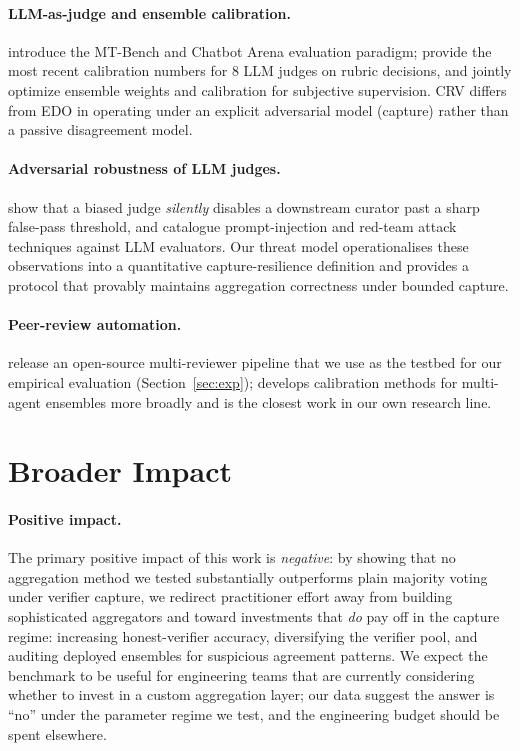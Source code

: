 \documentclass[11pt]{article}
\begin{document}
\paragraph{LLM-as-judge and ensemble calibration.}
\citet{zheng2023judging} introduce the MT-Bench and Chatbot Arena
evaluation paradigm; \citet{leung2026rubricllm} provide the most recent
calibration numbers for 8 LLM judges on rubric decisions, and
\citet{cui2026edo} jointly optimize ensemble weights and calibration for
subjective supervision. CRV differs from EDO in operating under an
explicit adversarial model (capture) rather than a passive disagreement
model.

\paragraph{Adversarial robustness of LLM judges.}
\citet{zhang2026blindcurator} show that a biased judge \emph{silently}
disables a downstream curator past a sharp false-pass threshold, and
\citet{perez2022red,schulhoff2023ignore} catalogue prompt-injection and
red-team attack techniques against LLM evaluators. Our threat model
operationalises these observations into a quantitative capture-resilience
definition and provides a protocol that provably maintains aggregation
correctness under bounded capture.

\paragraph{Peer-review automation.}
\citet{liu2026paperreviewtoolkit} release an open-source multi-reviewer
pipeline that we use as the testbed for our empirical evaluation
(Section~\ref{sec:exp}); \citet{liu2026calibration} develops calibration
methods for multi-agent ensembles more broadly and is the closest work
in our own research line.

\section{Broader Impact}
\label{sec:broader}

\paragraph{Positive impact.}
The primary positive impact of this work is \emph{negative}: by
showing that no aggregation method we tested substantially outperforms
plain majority voting under verifier capture, we redirect practitioner
effort away from building sophisticated aggregators and toward
investments that \emph{do} pay off in the capture regime: increasing
honest-verifier accuracy, diversifying the verifier pool, and
auditing deployed ensembles for suspicious agreement patterns. We
expect the benchmark to be useful for engineering teams that are
currently considering whether to invest in a custom aggregation
layer; our data suggest the answer is ``no'' under the parameter
regime we test, and the engineering budget should be spent elsewhere.
\end{document}
